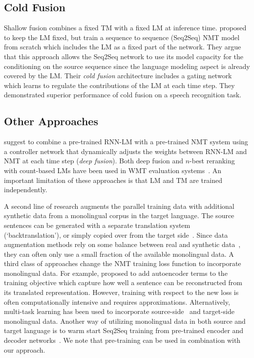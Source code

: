 \documentclass[11pt,a4paper]{article}
\begin{document}
\subsection{Cold Fusion}
\label{sec:cold-fusion}

Shallow fusion combines a fixed TM with a fixed LM at inference time. \citet{coldfusion} proposed to keep the LM fixed, but train a sequence to sequence (Seq2Seq) NMT model from scratch which includes the LM as a fixed part of the network. They argue that this approach allows the Seq2Seq network to use its model capacity for the conditioning on the source sequence since the language modeling aspect is already covered by the LM. Their {\em cold fusion} architecture includes a gating network which learns to regulate the contributions of the LM at each time step. They demonstrated superior performance of cold fusion on a speech recognition task.

\subsection{Other Approaches}


\citet{deepfusion,deepfusion-csl} suggest to combine a pre-trained RNN-LM with a pre-trained NMT system using a controller network that dynamically adjusts the weights between RNN-LM and NMT at each time step ({\em deep fusion}). Both deep fusion and $n$-best reranking with count-based LMs have been used in WMT evaluation systems~\citep{wmt15-montreal,wmt17-sogou}. An important limitation of these approaches is that LM and TM are trained independently. 

A second line of research augments the parallel training data with additional synthetic data from a monolingual corpus in the target language. The source sentences can be generated with a separate translation system~\citep{backtranslation-smt,backtranslation} (‘backtranslation’), or simply copied over from the target side~\citep{copytarget}. Since data augmentation methods rely on some balance between real and synthetic data~\citep{backtranslation,copytarget,investigating-backtranslation}, they can often only use a small fraction of the available monolingual data. A third class of approaches change the NMT training loss function to incorporate monolingual data. For example, \citet{autoencoder,reconstruction} proposed to add autoencoder terms to the training objective which capture how well a sentence can be reconstructed from its translated representation. However, training with respect to the new loss is often computationally intensive and requires approximations. Alternatively, multi-task learning has been used to incorporate source-side~\citep{source-multi-task} and target-side~\citep{target-multi-task} monolingual data. Another way of utilizing monolingual data in both source and target language is to warm start Seq2Seq training from pre-trained encoder and decoder networks~\citep{pretrain,pretrain-and-shallow-fusion}. We note that pre-training can be used in combination with our approach.
\end{document}
